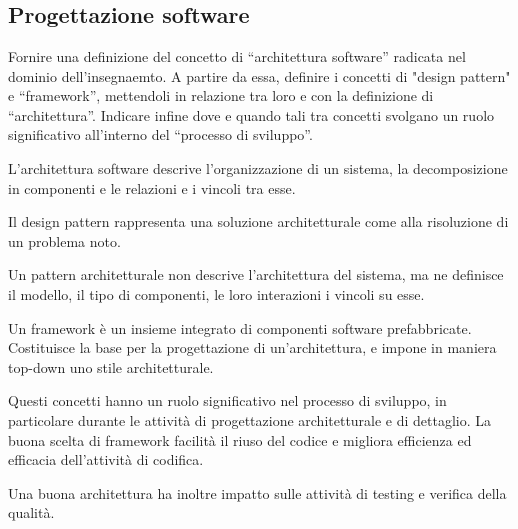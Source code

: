 \section{}

\subsection{Progettazione software}

\begin{question}
  Fornire una definizione del concetto di ``architettura software'' radicata nel
  dominio dell'insegnaemto. A partire da essa, definire i concetti di "design
  pattern" e ``framework'', mettendoli in relazione tra loro e con la
  definizione di ``architettura''. Indicare infine dove e quando tali tra concetti
  svolgano un ruolo significativo all'interno del ``processo di sviluppo''.
\end{question}

L'architettura software descrive l'organizzazione di un sistema, la
decomposizione in componenti e le relazioni e i vincoli tra esse.

Il design pattern rappresenta una soluzione architetturale come  alla risoluzione di un problema noto.

Un pattern architetturale non descrive l'architettura del sistema, ma ne
definisce il modello, il tipo di componenti, le loro interazioni i vincoli su
esse.

Un framework è un insieme integrato di componenti software prefabbricate.
Costituisce la base per la progettazione  di
un'architettura, e impone in maniera top-down uno stile architetturale.

Questi concetti hanno un ruolo significativo nel processo di sviluppo, in
particolare durante le attività di progettazione architetturale e di dettaglio.
La buona scelta di framework facilità il riuso del codice e migliora
efficienza ed efficacia dell'attività di codifica.

Una buona architettura ha inoltre impatto sulle attività di testing e verifica
della qualità.
